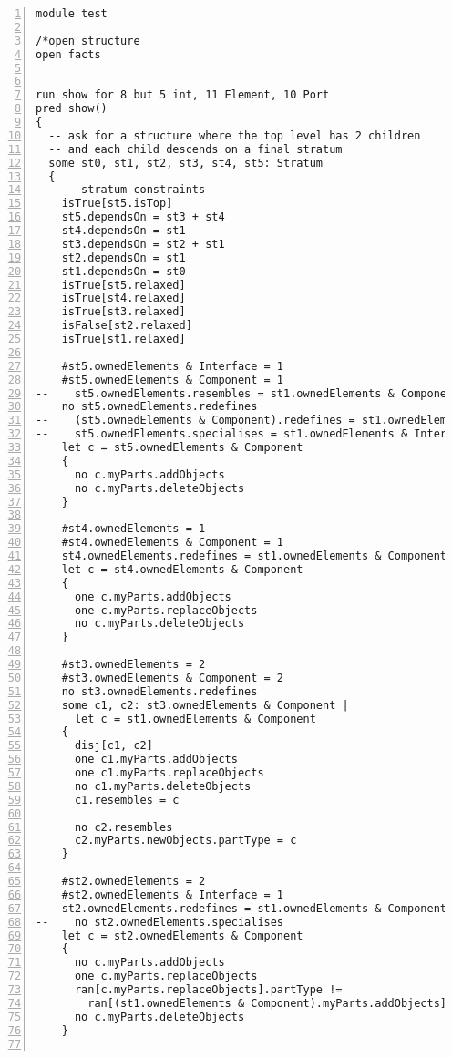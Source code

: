 \lstset{frame=tb, aboveskip=12pt, belowskip=-3pt, breaklines=true, basicstyle=\tiny\ttfamily, tabsize=2, mathescape=true}
\begin{lstlisting}[caption={test.als}, numbers=left]
module test

/*open structure
open facts


run show for 8 but 5 int, 11 Element, 10 Port
pred show()
{
  -- ask for a structure where the top level has 2 children
  -- and each child descends on a final stratum
  some st0, st1, st2, st3, st4, st5: Stratum
  {
    -- stratum constraints
    isTrue[st5.isTop]
    st5.dependsOn = st3 + st4
    st4.dependsOn = st1
    st3.dependsOn = st2 + st1
    st2.dependsOn = st1
    st1.dependsOn = st0
    isTrue[st5.relaxed]
    isTrue[st4.relaxed]
    isTrue[st3.relaxed]
    isFalse[st2.relaxed]
    isTrue[st1.relaxed]
    
    #st5.ownedElements & Interface = 1
    #st5.ownedElements & Component = 1
--    st5.ownedElements.resembles = st1.ownedElements & Component
    no st5.ownedElements.redefines
--    (st5.ownedElements & Component).redefines = st1.ownedElements & Component
--    st5.ownedElements.specialises = st1.ownedElements & Interface
    let c = st5.ownedElements & Component
    {
      no c.myParts.addObjects
      no c.myParts.deleteObjects
    }
    
    #st4.ownedElements = 1
    #st4.ownedElements & Component = 1
    st4.ownedElements.redefines = st1.ownedElements & Component
    let c = st4.ownedElements & Component
    {
      one c.myParts.addObjects
      one c.myParts.replaceObjects
      no c.myParts.deleteObjects
    }

    #st3.ownedElements = 2
    #st3.ownedElements & Component = 2
    no st3.ownedElements.redefines
    some c1, c2: st3.ownedElements & Component |
      let c = st1.ownedElements & Component
    {
      disj[c1, c2]
      one c1.myParts.addObjects
      one c1.myParts.replaceObjects
      no c1.myParts.deleteObjects
      c1.resembles = c
      
      no c2.resembles
      c2.myParts.newObjects.partType = c
    }

    #st2.ownedElements = 2
    #st2.ownedElements & Interface = 1
    st2.ownedElements.redefines = st1.ownedElements & Component  
--    no st2.ownedElements.specialises
    let c = st2.ownedElements & Component
    {
      no c.myParts.addObjects
      one c.myParts.replaceObjects
      ran[c.myParts.replaceObjects].partType !=
        ran[(st1.ownedElements & Component).myParts.addObjects].partType
      no c.myParts.deleteObjects      
    }
    

\end{lstlisting}
